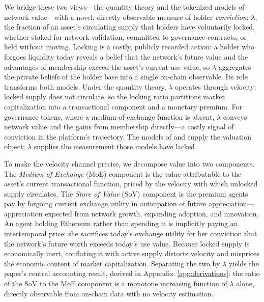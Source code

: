 \documentclass[12pt]{article}
\begin{document}
We bridge these two views---the quantity theory and the tokenized models of network
value---with a novel, directly observable measure of holder \textit{conviction}:
$\lambda$, the fraction of an asset's circulating supply that holders have voluntarily
locked, whether staked for network validation, committed to governance contracts, or
held without moving. Locking is a costly, publicly recorded action: a holder who
forgoes liquidity today reveals a belief that the network's future value and the
advantages of membership exceed the asset's current use value, so $\lambda$ aggregates
the private beliefs of the holder base into a single on-chain observable. Its role
transforms both models. Under the quantity theory, $\lambda$ operates through velocity:
locked supply does not circulate, so the locking ratio partitions market capitalization
into a transactional component and a monetary premium. For governance tokens, where a
medium-of-exchange function is absent, $\lambda$ conveys network value and the gains
from membership directly---a costly signal of conviction in the platform's trajectory.
The models of \citet{cong2021tokenomics} and \citet{sockin2020model} supply the
valuation object; $\lambda$ supplies the measurement those models have lacked.

To make the velocity channel precise, we decompose value into two components. The
\textit{Medium of Exchange} (MoE) component is the value attributable to the asset's
current transactional function, priced by the velocity with which unlocked supply
circulates. The \textit{Store of Value} (SoV) component is the premium agents pay by
forgoing current exchange utility in anticipation of future appreciation---appreciation
expected from network growth, expanding adoption, and innovation. An agent holding
Ethereum rather than spending it is implicitly paying an intertemporal price: she
sacrifices today's exchange utility for her conviction that the network's future worth
exceeds today's use value. Because locked supply is economically inert, conflating it
with active supply distorts velocity and misprices the economic content of market
capitalization. Separating the two by $\lambda$ yields the paper's central accounting
result, derived in Appendix~\ref{app:derivations}: the ratio of the SoV to the MoE
component is a monotone increasing function of $\lambda$ alone, directly observable
from on-chain data with no velocity estimation.
\end{document}
